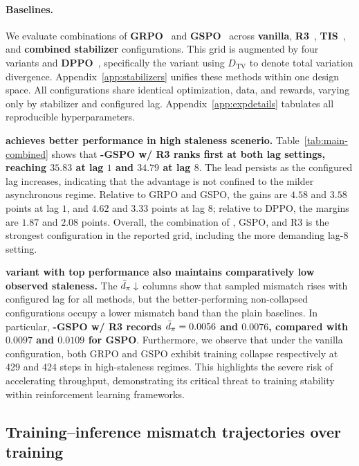 \paragraph{Baselines.}
We evaluate combinations of \textbf{GRPO}~\citep{shao2024deepseekmath} and \textbf{GSPO}~\citep{zheng2025gspo} across \textbf{vanilla}, \textbf{R3}~\citep{ma2025r3}, \textbf{TIS}~\citep{zheng2025tis}, and \textbf{combined stabilizer} configurations. This grid is augmented by four \satr variants and \textbf{DPPO}~\citep{qi2026dppo}, specifically the variant using $D_{\mathrm{TV}}$ to denote total variation divergence. Appendix~\ref{app:stabilizers} unifies these methods within one design space. All configurations share identical optimization, data, and rewards, varying only by stabilizer and configured lag. Appendix~\ref{app:expdetails} tabulates all reproducible hyperparameters.



\textbf{\satr achieves better performance in high staleness scenerio.} Table~\ref{tab:main-combined} shows that \textbf{\satr-GSPO w/ R3 ranks first at both lag settings, reaching $35.83$ at lag $1$ and $34.79$ at lag $8$}. The lead persists as the configured lag increases, indicating that the advantage is not confined to the milder asynchronous regime. Relative to GRPO and GSPO, the gains are $4.58$ and $3.58$ points at lag $1$, and $4.62$ and $3.33$ points at lag $8$; relative to DPPO, the margins are $1.87$ and $2.08$ points. Overall, the combination of \satr{}, GSPO, and R3 is the strongest configuration in the reported grid, including the more demanding lag-$8$ setting.

\textbf{\satr{} variant with top performance also maintains comparatively low observed staleness.} The $\bar d_\pi\downarrow$ columns show that sampled mismatch rises with configured lag for all methods, but the better-performing non-collapsed configurations occupy a lower mismatch band than the plain baselines. In particular, \textbf{\satr-GSPO w/ R3 records $\bar d_\pi=0.0056$ and $0.0076$, compared with $0.0097$ and $0.0109$ for GSPO}. Furthermore, we observe that under the vanilla configuration, both GRPO and GSPO exhibit training collapse respectively at 429 and 424 steps in high-staleness regimes. This highlights the severe risk of accelerating throughput, demonstrating its critical threat to training stability within reinforcement learning frameworks.

\subsection{Training--inference mismatch trajectories over training}
\label{sec:exp-drift}

